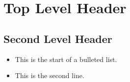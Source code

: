 \documentclass[10pt]{article}
\begin{document}
\renewcommand\labelitemi{$\vcenter{\hbox{\tiny$\bullet$}}$}
\renewcommand\labelitemii{$\vcenter{\hbox{\tiny$\bullet$}}$}

\section{Top Level Header}
\subsection{Second Level Header}
\begin{itemize}
    \item This is the start of a bulleted list.
    \item This is the second line.
\end{itemize}
\end{document}
